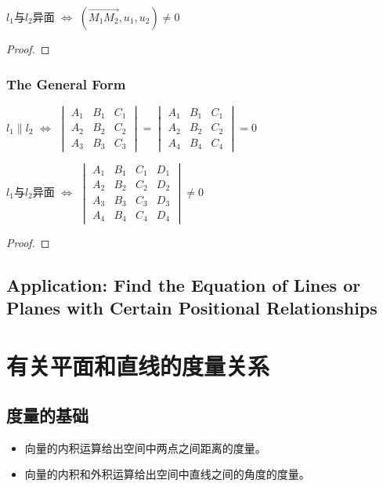 \documentclass[onecolumn]{ctexart}
\begin{document}
$l_1$与$l_2$异面 $\Leftrightarrow$ $(\vec{M_1M_2}, u_1, u_2) \neq 0$

\begin{proof}
  
\end{proof}

\subsubsection{The General Form}

$l_1 \parallel l_2$ $\Leftrightarrow$ $
\begin{vmatrix}
  A_1 & B_1 & C_1 \\
  A_2 & B_2 & C_2 \\
  A_3 & B_3 & C_3 
\end{vmatrix} = 
\begin{vmatrix}
  A_1 & B_1 & C_1 \\
  A_2 & B_2 & C_2 \\
  A_4 & B_4 & C_4  
\end{vmatrix} = 0$

$l_1$与$l_2$异面 $\Leftrightarrow$ $
\begin{vmatrix}
  A_1 & B_1 & C_1 & D_1 \\
  A_2 & B_2 & C_2 & D_2 \\
  A_3 & B_3 & C_3 & D_3 \\
  A_4 & B_4 & C_4 & D_4
\end{vmatrix} \neq 0$

\begin{proof}
  
\end{proof}

\subsection{Application: Find the Equation of Lines or Planes with Certain Positional Relationships}

\section{有关平面和直线的度量关系}

\subsection{度量的基础}
\begin{itemize}
  \item 向量的内积运算给出空间中两点之间距离的度量。
  \item 向量的内积和外积运算给出空间中直线之间的角度的度量。
\end{itemize}
\end{document}
